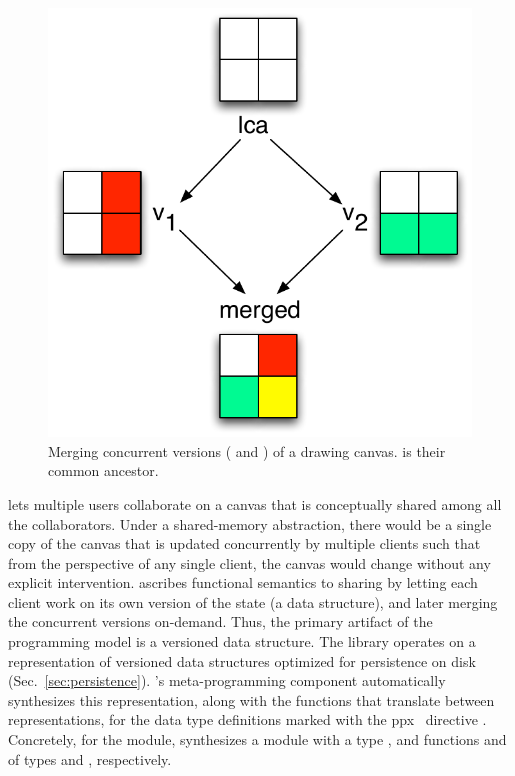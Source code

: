 \begin{figure}
\centering
\includegraphics[scale=0.5]{Figures/canvas-merging}

\caption{Merging concurrent versions ( and  ) of a drawing
canvas.  is their common ancestor.}
\label{fig:canvas-merging}
\end{figure}

\drawsome lets multiple users collaborate on a canvas that is
conceptually shared among all the collaborators. Under a shared-memory
abstraction, there would be a single copy of the canvas that is
updated concurrently by multiple clients such that from the
perspective of any single client, the canvas would change without any
explicit intervention. \name ascribes functional semantics to sharing
by letting each client work on its own version of the state (a data
structure), and later merging the concurrent versions on-demand. Thus,
the primary artifact of the \name programming model is a versioned
data structure. The library operates on a representation of versioned
data structures optimized for persistence on disk
(Sec.~\ref{sec:persistence}). \name's meta-programming component
automatically synthesizes this representation, along with the
functions that translate between representations, for the data type
definitions marked with the ppx~\cite{ppx} directive . Concretely, for the  module, \name synthesizes
a  module with a type , and functions
 and  of types  and , respectively.

